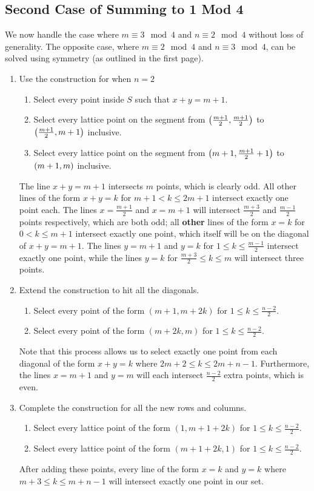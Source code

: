 \documentclass[10pt]{../usamts}
\begin{document}
\begin{solution}
\clearpage
\section*{Second Case of Summing to 1 Mod 4}
We now handle the case where $m \equiv 3 \mod 4$ and $n \equiv 2 \mod 4$ without loss of generality. The opposite case, where $m \equiv 2 \mod 4$ and $n \equiv 3 \mod 4$, can be solved using symmetry (as outlined in the first page).

\begin{enumerate}
    \item Use the construction for when $n=2$
    \begin{enumerate}
        \item Select every point inside $S$ such that $x+y = m+1$.
        \item Select every lattice point on the segment from $\left( \frac{m+1}{2}, \frac{m+1}{2} \right)$ to $\left( \frac{m+1}{2}, m+1 \right)$ inclusive.
        \item Select every lattice point on the segment from $\left( m+1, \frac{m+1}{2}+1 \right)$ to $\left( m+1, m \right)$ inclusive.
    \end{enumerate}
    The line $x+y=m+1$ intersects $m$ points, which is clearly odd. All other lines of the form $x+y=k$ for $m+1 < k \leq 2m+1$ intersect exactly one point each. The lines $x=\frac{m+1}{2}$ and $x=m+1$ will intersect $\frac{m+3}{2}$ and $\frac{m-1}{2}$ points respectively, which are both odd; all \textbf{other} lines of the form $x=k$ for $0 < k \leq m+1$ intersect exactly one point, which itself will be on the diagonal of $x+y=m+1$. The lines $y=m+1$ and $y=k$ for $1 \leq k \leq \frac{m-1}{2}$ intersect exactly one point, while the lines $y=k$ for $\frac{m+3}{2} \leq k \leq m$ will intersect three points.
    \item Extend the construction to hit all the diagonals.
    \begin{enumerate}
        \item Select every point of the form $(m+1, m+2k)$ for $1 \leq k \leq \frac{n-2}{2}$.
        \item Select every point of the form $(m+2k, m)$ for $1 \leq k \leq \frac{n-2}{2}$.
    \end{enumerate}
    Note that this process allows us to select exactly one point from each diagonal of the form $x+y=k$ where $2m+2 \leq k \leq 2m+n-1$.
    Furthermore, the lines $x=m+1$ and $y=m$ will each intersect $\frac{n-2}{2}$ extra points, which is even.
    \item Complete the construction for all the new rows and columns.
    \begin{enumerate}
        \item Select every lattice point of the form $(1, m+1+2k)$ for $1 \leq k \leq \frac{n-2}{2}$.
        \item Select every lattice point of the form $(m+1+2k, 1)$ for $1 \leq k \leq \frac{n-2}{2}$.
    \end{enumerate}
    After adding these points, every line of the form $x=k$ and $y=k$ where $m+3 \leq k \leq m+n-1$ will intersect exactly one point in our set.
    

\end{enumerate}
\end{solution}
\end{document}

